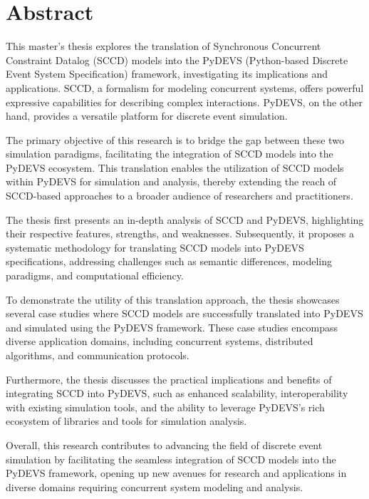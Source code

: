 \clearpage 
{} 
{}
\chapter*{Abstract}
This master's thesis explores the translation of Synchronous Concurrent Constraint Datalog (SCCD) models into the PyDEVS (Python-based Discrete Event System Specification) framework, investigating its implications and applications. SCCD, a formalism for modeling concurrent systems, offers powerful expressive capabilities for describing complex interactions. PyDEVS, on the other hand, provides a versatile platform for discrete event simulation.

The primary objective of this research is to bridge the gap between these two simulation paradigms, facilitating the integration of SCCD models into the PyDEVS ecosystem. This translation enables the utilization of SCCD models within PyDEVS for simulation and analysis, thereby extending the reach of SCCD-based approaches to a broader audience of researchers and practitioners.

The thesis first presents an in-depth analysis of SCCD and PyDEVS, highlighting their respective features, strengths, and weaknesses. Subsequently, it proposes a systematic methodology for translating SCCD models into PyDEVS specifications, addressing challenges such as semantic differences, modeling paradigms, and computational efficiency.

To demonstrate the utility of this translation approach, the thesis showcases several case studies where SCCD models are successfully translated into PyDEVS and simulated using the PyDEVS framework. These case studies encompass diverse application domains, including concurrent systems, distributed algorithms, and communication protocols.

Furthermore, the thesis discusses the practical implications and benefits of integrating SCCD into PyDEVS, such as enhanced scalability, interoperability with existing simulation tools, and the ability to leverage PyDEVS's rich ecosystem of libraries and tools for simulation analysis.

Overall, this research contributes to advancing the field of discrete event simulation by facilitating the seamless integration of SCCD models into the PyDEVS framework, opening up new avenues for research and applications in diverse domains requiring concurrent system modeling and analysis.